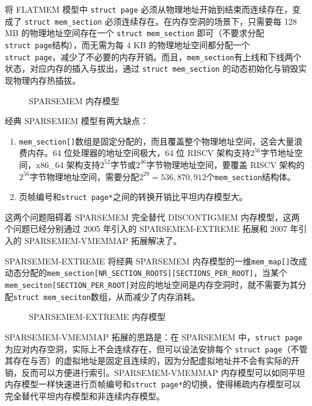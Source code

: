 \documentclass[AutoFakeBold]{LZUThesis}
\begin{document}
\begin{sloppypar}
将 FLATMEM 模型中 \texttt{struct\ page}
必须从物理地址开始到结束而连续存在，变成了 \texttt{struct\ mem\_section}
必须连续存在。在内存空洞的场景下，只需要每 128 MB 的物理地址空间存在一个
\texttt{struct\ mem\_section}
即可（不要求分配\texttt{struct\ page}结构），而无需为每 4 KB
的物理地址空间都分配一个
\texttt{struct\ page}，减少了不必要的内存开销。而且，\texttt{mem\_section}有上线和下线两个状态，对应内存的插入与拔出，通过
\texttt{struct\ mem\_section} 的动态初始化与销毁实现物理内存热插拔。

\begin{figure}[htb]
\centering

\caption{SPARSEMEM 内存模型}
\end{figure}

经典 SPARSEMEM 模型有两大缺点：

\begin{enumerate}
\def\labelenumi{\arabic{enumi}.}
\item
  \texttt{mem\_section{[}{]}}数组是固定分配的，而且覆盖整个物理地址空间，这会大量浪费内存。64
  位处理器的地址空间极大，64 位 RISCV
  架构支持\(2^{56}\)字节地址空间，x86\_64
  架构支持\(2^{52}\)字节或\(2^{46}\)字节物理地址空间，要覆盖 RISCV
  架构的\(2^{56}\)字节物理地址空间，需要分配\(2^{29} = 536,870,912\)个\texttt{mem\_section}结构体。
\item
  页帧编号和\texttt{struct\ page*}之间的转换开销比平坦内存模型大。
\end{enumerate}

这两个问题阻碍着 SPARSEMEM 完全替代 DISCONTIGMEM
内存模型，这两个问题已经分别通过 2005 年引入的 SPARSEMEM-EXTREME 拓展和
2007 年引入的 SPARSEMEM-VMEMMAP 拓展解决了。

SPARSEMEM-EXTREME 将经典 SPARSEMEM
内存模型的一维\texttt{mem\_map{[}{]}}改成动态分配的\texttt{mem\_section{[}NR\_SECTION\_ROOTS{]}{[}SECTIONS\_PER\_ROOT{]}}，当某个\texttt{mem\_seciton{[}SECTION\_PER\_ROOT{]}}对应的地址空间是内存空洞时，就不需要为其分配\texttt{struct\ mem\_seciton}数组，从而减少了内存消耗。

\begin{figure}[htb]
\centering

\caption{SPARSEMEM-EXTREME 内存模型}
\end{figure}

SPARSEMEM-VMEMMAP 拓展的思路是：在 SPARSEMEM 中，\texttt{struct\ page}
为应对内存空洞，实际上不会连续存在，但可以设法安排每个
\texttt{struct\ page}（不管其存在与否）的虚拟地址是固定且连续的，因为分配虚拟地址并不会有实际的开销，反而可以方便进行索引。SPARSEMEM-VMEMMAP
内存模型可以如同平坦内存模型一样快速进行页帧编号和\texttt{struct\ page*}的切换，使得稀疏内存模型可以完全替代平坦内存模型和非连续内存模型。


\end{sloppypar}
\end{document}

